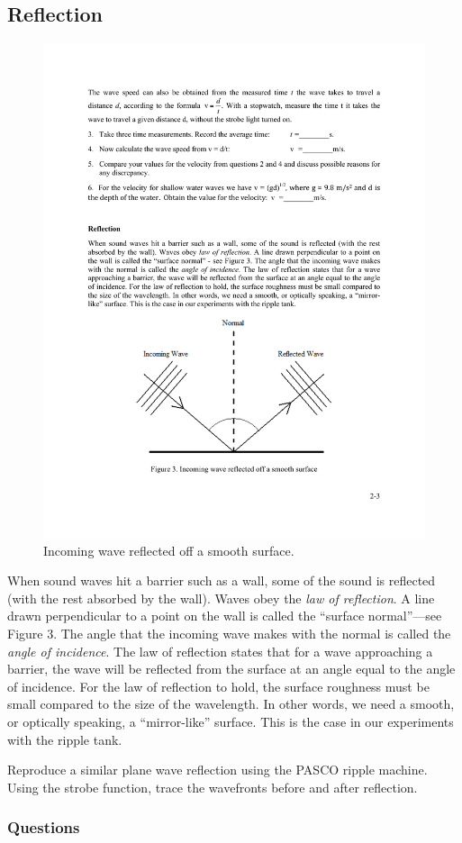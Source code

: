 \documentclass[11pt]{NSF}
\begin{document}
\subsection{Reflection}
%
\begin{figure}[hbtp]
\begin{center}
\includegraphics[width=.6\textwidth]{fig2_3}
\caption{Incoming wave reflected off a smooth surface.}
\label{f:3}
\end{center}
\end{figure}
%
When sound waves hit a barrier such as a wall, some of the sound is reflected
(with the rest absorbed by the wall). 
Waves obey the {\em law of reflection}. 
A line
drawn perpendicular to a point on the wall is called the ``surface normal”---see
Figure 3. The angle that the incoming wave makes with the normal is called the
{\em angle of incidence}. The law of reflection states that for a wave approaching a
barrier, the wave will be reflected from the surface at an angle equal to the
angle of incidence. For the law of reflection to hold, the surface roughness
must be small compared to the size of the wavelength. In other words, we need a
smooth, or optically speaking, a ``mirror-like” surface. This is the case in
our experiments with the ripple tank.

Reproduce a similar plane wave reflection using the PASCO ripple machine. Using the strobe function, trace the wavefronts before and after reflection.  

\subsubsection*{Questions}
\end{document}
